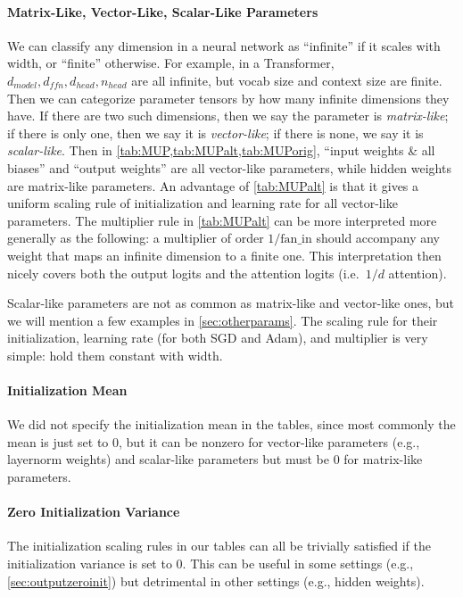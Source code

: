 \documentclass{article}
\theoremstyle{definition}
\newcommand{\fanin}{\mathrm{fan\_in}}
\begin{document}
\paragraph{Matrix-Like, Vector-Like, Scalar-Like Parameters}
We can classify any dimension in a neural network as ``infinite'' if it scales with width, or ``finite'' otherwise.
For example, in a Transformer, $d_{model}, d_{ffn}, d_{head}, n_{head}$ are all infinite, but vocab size and context size are finite.
Then we can categorize parameter tensors by how many infinite dimensions they have.
If there are two such dimensions, then we say the parameter is \emph{matrix-like}; if there is only one, then we say it is \emph{vector-like}; if there is none, we say it is \emph{scalar-like}.
Then in \cref{tab:MUP,tab:MUPalt,tab:MUPorig}, ``input weights \& all biases'' and ``output weights'' are all vector-like parameters, while hidden weights are matrix-like parameters.
An advantage of \cref{tab:MUPalt} is that it gives a uniform scaling rule of initialization and learning rate for all vector-like parameters.
The multiplier rule in \cref{tab:MUPalt} can be more interpreted more generally as the following: a multiplier of order $1/\fanin$ should accompany any weight that maps an infinite dimension to a finite one.
This interpretation then nicely covers both the output logits and the attention logits (i.e.\ $1/d$ attention).

Scalar-like parameters are not as common as matrix-like and vector-like ones, but we will mention a few examples in \cref{sec:otherparams}.
The scaling rule for their initialization, learning rate (for both SGD and Adam), and multiplier is very simple: hold them constant with width.

\paragraph{Initialization Mean}
We did not specify the initialization mean in the tables, since most commonly the mean is just set to 0,
but it can be nonzero for vector-like parameters (e.g., layernorm weights) and scalar-like parameters but must be 0 for matrix-like parameters.

\paragraph{Zero Initialization Variance}
The initialization scaling rules in our tables can all be trivially satisfied if the initialization variance is set to 0.
This can be useful in some settings (e.g., \cref{sec:outputzeroinit}) but detrimental in other settings (e.g., hidden weights).
\end{document}
